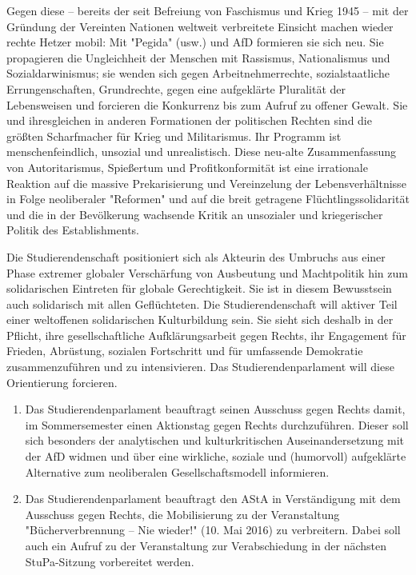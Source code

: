 \documentclass[ngerman,headheight=70pt]{scrartcl}
\begin{document}
    Gegen diese – bereits der seit Befreiung von Faschismus und Krieg 1945 – mit
    der Gründung der Vereinten Nationen weltweit verbreitete Einsicht machen
    wieder rechte Hetzer mobil: Mit "Pegida" (usw.) und AfD formieren sie sich neu.
    Sie propagieren die Ungleichheit der Menschen mit Rassismus, Nationalismus und
    Sozialdarwinismus; sie wenden sich gegen Arbeitnehmerrechte, sozialstaatliche
    Errungenschaften, Grundrechte, gegen eine aufgeklärte Pluralität der Lebensweisen
    und forcieren die Konkurrenz bis zum Aufruf zu offener Gewalt. Sie und
    ihresgleichen in anderen Formationen der politischen Rechten sind die größten
    Scharfmacher für Krieg und Militarismus. Ihr Programm ist menschenfeindlich,
    unsozial und unrealistisch. Diese neu-alte Zusammenfassung von Autoritarismus,
    Spießertum und Profitkonformität ist eine irrationale Reaktion auf die massive
    Prekarisierung und Vereinzelung der Lebensverhältnisse in Folge neoliberaler
    "Reformen" und auf die breit getragene Flüchtlingssolidarität und die in der
    Bevölkerung wachsende Kritik an unsozialer und kriegerischer Politik des
    Establishments.

    Die Studierendenschaft positioniert sich als Akteurin des Umbruchs aus einer
    Phase extremer globaler Verschärfung von Ausbeutung und Machtpolitik hin zum
    solidarischen Eintreten für globale Gerechtigkeit. Sie ist in diesem
    Bewusstsein auch solidarisch mit allen Geflüchteten. Die Studierendenschaft
    will aktiver Teil einer weltoffenen solidarischen Kulturbildung sein. Sie sieht
    sich deshalb in der Pflicht, ihre gesellschaftliche Aufklärungsarbeit gegen
    Rechts, ihr Engagement für Frieden, Abrüstung, sozialen Fortschritt und für
    umfassende Demokratie zusammenzuführen und zu intensivieren. Das
    Studierendenparlament will diese Orientierung forcieren.

    \begin{enumerate}
        \item Das Studierendenparlament beauftragt seinen Ausschuss gegen Rechts
        damit, im Sommersemester einen Aktionstag gegen Rechts durchzuführen.
        Dieser soll sich besonders der analytischen und kulturkritischen
        Auseinandersetzung mit der AfD widmen und über eine wirkliche, soziale und
        (humorvoll) aufgeklärte Alternative zum neoliberalen Gesellschaftsmodell
        informieren.
        \item Das Studierendenparlament beauftragt den AStA in Verständigung mit
        dem Ausschuss gegen Rechts, die Mobilisierung zu der Veranstaltung
        "Bücherverbrennung – Nie wieder!" (10. Mai 2016) zu verbreitern. Dabei
        soll auch ein Aufruf zu der Veranstaltung zur Verabschiedung in der
        nächsten StuPa-Sitzung vorbereitet werden.
    \end{enumerate}
\end{document}

